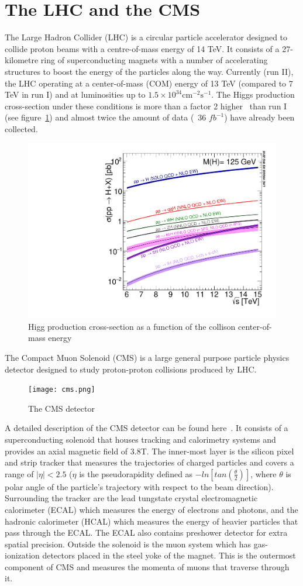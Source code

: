 \documentclass[a4paper,11pt]{article}
\begin{document}
\section{The LHC and the CMS }
\label{sec:lhccms} 
The Large Hadron Collider (LHC) is a circular particle accelerator designed to collide proton beams with a centre-of-mass energy of 14 TeV. It consists of a 27-kilometre ring of superconducting magnets with a number of accelerating structures to boost the energy of the particles along the way. Currently (run II), the LHC operating at a center-of-mass (COM) energy of 13 TeV (compared to 7 TeV in run I) and at luminosities up to $1.5 \times 10^{34} \mathrm{cm^{-2}s^{-1}}$. The Higgs production cross-section under these conditions is more than a factor 2 higher~\cite{f} than run I (see figure~\ref{fig:a}) and almost twice the amount of data (~36 $fb^{-1}$) have already been collected.     

\begin{figure}[htbp]
\centering
\includegraphics[width=.40\textwidth]{Plot_Escan_H125_new_sqrt.pdf}
\qquad
\caption{\label{fig:a} Higg production cross-section as a function of the collison center-of-mass energy  }
\end{figure}

The Compact Muon Solenoid (CMS) is a large general purpose particle physics  detector  designed to study proton-proton collisions produced by LHC. 
\begin{figure}
  \centering
    \texttt{[image: cms.png]}
  \caption{\label{fig:b} The CMS detector  }
\end{figure}
A detailed description of the CMS detector can be found here~\cite{g}.
It consists of a superconducting solenoid that houses tracking and calorimetry systems and provides an axial magnetic field of 3.8T. The inner-most layer is the silicon pixel and strip tracker that measures the trajectories of charged particles and covers a range of $|\eta|<2.5$ ($\eta$ is the pseudorapidity defined as $-ln[tan(\frac{\theta}{2})]$, where $\theta$ is polar angle of the particle's trajectory with respect to the beam direction). Surrounding the tracker are the lead tungstate crystal electromagnetic calorimeter (ECAL) which measures the energy of electrons and photons, and the hadronic calorimeter (HCAL) which measures the energy of heavier particles that pass through the ECAL. The ECAL also contains preshower detector for extra spatial precision. Outside the solenoid is the muon system which has gas-ionization detectors placed in the steel yoke of the magnet. This is the outermost component of CMS and measures the momenta of muons that traverse through it.
\end{document}
